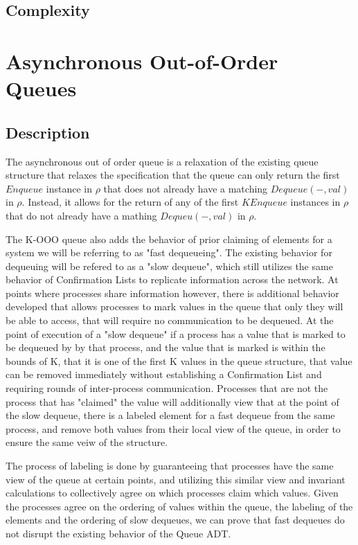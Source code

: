 \documentclass[a4paper,USenglish]{lipics-v2021} %
\begin{document}
\subsection{Complexity}

\section{Asynchronous Out-of-Order Queues}

\subsection{Description}

The asynchronous out of order queue is a relaxation of the existing queue structure that relaxes the specification that the queue can only return the first $Enqueue$ instance in $\rho$ that does not already have a matching $Dequeue(-, val)$ in $\rho$. Instead, it allows for the return of any of the first $K Enqueue$ instances in $\rho$ that do not already have a mathing $Dequeu(-, val)$ in $\rho$. 

The K-OOO queue also adds the behavior of prior claiming of elements for a system we will be referring to as "fast dequeueing". The existing behavior for dequeuing will be refered to as a "slow dequeue", which still utilizes the same behavior of Confirmation Lists to replicate information across the network. At points where processes share information however, there is additional behavior developed that allows processes to mark values in the queue that only they will be able to access, that will require no communication to be dequeued. At the point of execution of a "slow dequeue" if a process has a value that is marked to be dequeued by by that process, and the value that is marked is within the bounds of K, that it is one of the first K values in the queue structure, that value can be removed immediately without establishing a Confirmation List and requiring rounds of inter-process communication. Processes that are not the process that has "claimed" the value will additionally view that at the point of the slow dequeue, there is a labeled element for a fast dequeue from the same process, and remove both values from their local view of the queue, in order to ensure the same veiw of the structure. 

The process of labeling is done by guaranteeing that processes have the same view of the queue at certain points, and utilizing this similar view and invariant calculations to collectively agree on which processes claim which values. Given the processes agree on the ordering of values within the queue, the labeling of the elements and the ordering of slow dequeues, we can prove that fast dequeues do not disrupt the existing behavior of the Queue ADT. 
\end{document}
